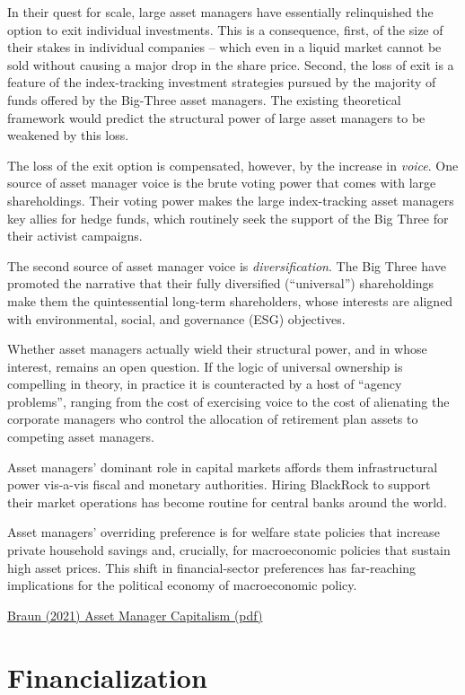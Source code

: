 \documentclass[
]{book}
\begin{document}
In their quest for scale, large asset
managers have essentially relinquished the option to exit individual investments.
This is a consequence, first, of the size of
their stakes in individual companies -- which even in a liquid market cannot be sold
without causing a major drop in the share price. Second, the loss of exit is a feature of
the index-tracking investment strategies pursued by the majority of funds offered by the
Big-Three asset managers. The existing theoretical framework would predict the
structural power of large asset managers to be weakened by this loss.

The loss of the exit option is compensated, however, by the increase in \emph{voice}. One source
of asset manager voice is the brute voting power that comes with large shareholdings.
Their voting power makes the large index-tracking asset managers key allies for hedge
funds, which routinely seek the support of the Big Three for their activist campaigns.

The second source of asset manager voice is \emph{diversification}. The Big Three have promoted
the narrative that their fully diversified (``universal'') shareholdings make them the
quintessential long-term shareholders, whose interests are aligned with environmental,
social, and governance (ESG) objectives.

Whether asset managers actually wield their structural power, and in whose interest,
remains an open question.
If the logic of universal ownership
is compelling in theory, in practice it is counteracted by a host of ``agency problems'',
ranging from the cost of exercising voice to the cost of alienating the corporate managers
who control the allocation of retirement plan assets to competing asset managers.

Asset managers' dominant role in capital
markets affords them infrastructural power vis-a-vis fiscal and monetary authorities.
Hiring BlackRock to support their market operations has become routine
for central banks around the world.

Asset managers'
overriding preference is for welfare state policies that increase private household savings
and, crucially, for macroeconomic policies that sustain high asset prices.
This
shift in financial-sector preferences has far-reaching implications for the political economy
of macroeconomic policy.

\href{pdf/Braun_2021_Asset_Mamager_Capitalism.pdf}{Braun (2021) Asset Manager Capitalism (pdf)}

\hypertarget{financialization}{%
\chapter{Financialization}\label{financialization}}
\end{document}
